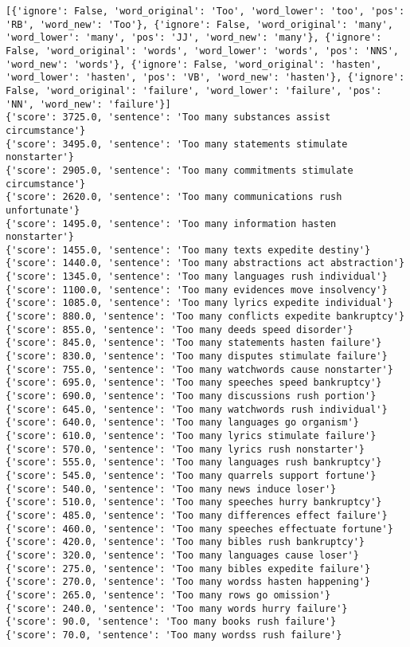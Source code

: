 \documentclass[12pt,a4paper,oneside]{book}
\begin{document}
\begin{verbatim}
[{'ignore': False, 'word_original': 'Too', 'word_lower': 'too', 'pos': 'RB', 'word_new': 'Too'}, {'ignore': False, 'word_original': 'many', 'word_lower': 'many', 'pos': 'JJ', 'word_new': 'many'}, {'ignore': False, 'word_original': 'words', 'word_lower': 'words', 'pos': 'NNS', 'word_new': 'words'}, {'ignore': False, 'word_original': 'hasten', 'word_lower': 'hasten', 'pos': 'VB', 'word_new': 'hasten'}, {'ignore': False, 'word_original': 'failure', 'word_lower': 'failure', 'pos': 'NN', 'word_new': 'failure'}]
{'score': 3725.0, 'sentence': 'Too many substances assist circumstance'}
{'score': 3495.0, 'sentence': 'Too many statements stimulate nonstarter'}
{'score': 2905.0, 'sentence': 'Too many commitments stimulate circumstance'}
{'score': 2620.0, 'sentence': 'Too many communications rush unfortunate'}
{'score': 1495.0, 'sentence': 'Too many information hasten nonstarter'}
{'score': 1455.0, 'sentence': 'Too many texts expedite destiny'}
{'score': 1440.0, 'sentence': 'Too many abstractions act abstraction'}
{'score': 1345.0, 'sentence': 'Too many languages rush individual'}
{'score': 1100.0, 'sentence': 'Too many evidences move insolvency'}
{'score': 1085.0, 'sentence': 'Too many lyrics expedite individual'}
{'score': 880.0, 'sentence': 'Too many conflicts expedite bankruptcy'}
{'score': 855.0, 'sentence': 'Too many deeds speed disorder'}
{'score': 845.0, 'sentence': 'Too many statements hasten failure'}
{'score': 830.0, 'sentence': 'Too many disputes stimulate failure'}
{'score': 755.0, 'sentence': 'Too many watchwords cause nonstarter'}
{'score': 695.0, 'sentence': 'Too many speeches speed bankruptcy'}
{'score': 690.0, 'sentence': 'Too many discussions rush portion'}
{'score': 645.0, 'sentence': 'Too many watchwords rush individual'}
{'score': 640.0, 'sentence': 'Too many languages go organism'}
{'score': 610.0, 'sentence': 'Too many lyrics stimulate failure'}
{'score': 570.0, 'sentence': 'Too many lyrics rush nonstarter'}
{'score': 555.0, 'sentence': 'Too many languages rush bankruptcy'}
{'score': 545.0, 'sentence': 'Too many quarrels support fortune'}
{'score': 540.0, 'sentence': 'Too many news induce loser'}
{'score': 510.0, 'sentence': 'Too many speeches hurry bankruptcy'}
{'score': 485.0, 'sentence': 'Too many differences effect failure'}
{'score': 460.0, 'sentence': 'Too many speeches effectuate fortune'}
{'score': 420.0, 'sentence': 'Too many bibles rush bankruptcy'}
{'score': 320.0, 'sentence': 'Too many languages cause loser'}
{'score': 275.0, 'sentence': 'Too many bibles expedite failure'}
{'score': 270.0, 'sentence': 'Too many wordss hasten happening'}
{'score': 265.0, 'sentence': 'Too many rows go omission'}
{'score': 240.0, 'sentence': 'Too many words hurry failure'}
{'score': 90.0, 'sentence': 'Too many books rush failure'}
{'score': 70.0, 'sentence': 'Too many wordss rush failure'}


\end{verbatim}
\end{document}
